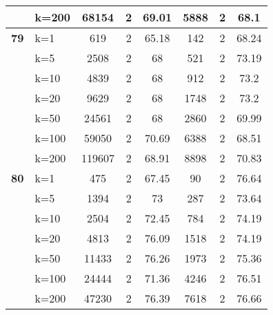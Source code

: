 \begin{table}[htbp]
\begin{tabular}{|l|l|c|c|c|c|c|c|}
     & k=200 & 68154 & 2 & 69.01 & 5888 & 2 & 68.1 \\ \hline
    \multicolumn{1}{|r|}{\textbf{79}} & k=1 & 619 & 2 & 65.18 & 142 & 2 & 68.24 \\ 
     & k=5 & 2508 & 2 & 68 & 521 & 2 & 73.19 \\ 
     & k=10 & 4839 & 2 & 68 & 912 & 2 & 73.2 \\ 
     & k=20 & 9629 & 2 & 68 & 1748 & 2 & 73.2 \\ 
     & k=50 & 24561 & 2 & 68 & 2860 & 2 & 69.99 \\ 
     & k=100 & 59050 & 2 & 70.69 & 6388 & 2 & 68.51 \\ 
     & k=200 & 119607 & 2 & 68.91 & 8898 & 2 & 70.83 \\ \hline
    \multicolumn{1}{|r|}{\textbf{80}} & k=1 & 475 & 2 & 67.45 & 90 & 2 & 76.64 \\ 
     & k=5 & 1394 & 2 & 73 & 287 & 2 & 73.64 \\ 
     & k=10 & 2504 & 2 & 72.45 & 784 & 2 & 74.19 \\ 
     & k=20 & 4813 & 2 & 76.09 & 1518 & 2 & 74.19 \\ 
     & k=50 & 11433 & 2 & 76.26 & 1973 & 2 & 75.36 \\ 
     & k=100 & 24444 & 2 & 71.36 & 4246 & 2 & 76.51 \\ 
     & k=200 & 47230 & 2 & 76.39 & 7618 & 2 & 76.66 \\ \hline
    \end{tabular}
\end{table}
